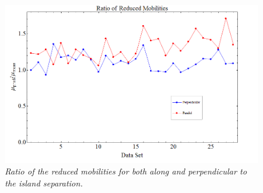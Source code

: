 \documentclass[11pt]{article}
\begin{document}
\begin{figure}
\centering
\includegraphics[scale=0.4]{Images/2IslandRedMobRatio.png}
\caption{\textit{Ratio of the reduced mobilities for both along and perpendicular to the island separation.}}
\label{ratio}
\end{figure}
\end{document}
